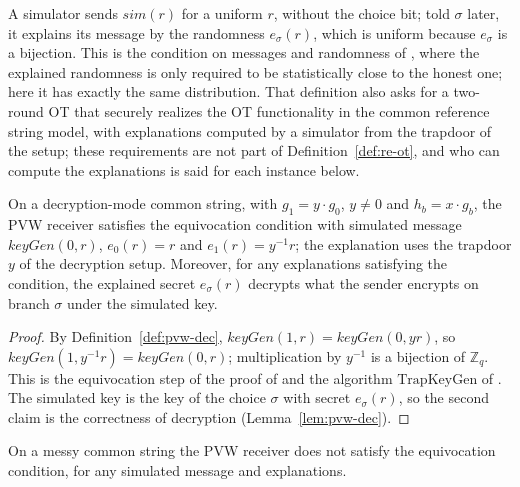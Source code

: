 A simulator sends $\mathit{sim}(r)$ for a uniform $r$, without the choice bit; told $\sigma$ later,
it explains its message by the randomness $e_\sigma(r)$, which is uniform because $e_\sigma$ is a
bijection. This is the condition on messages and randomness of \cite[Sect.~3, Definition~3.1]{GKPS18},
where the explained randomness is only required to be statistically close to the honest one; here
it has exactly the same distribution. That definition also asks for a two-round OT that securely
realizes the OT functionality in the common reference string model, with explanations computed by
a simulator from the trapdoor of the setup; these requirements are not part of
Definition~\ref{def:re-ot}, and who can compute the explanations is said for each instance below.

\begin{theorem}
  \label{thm:pvw-re}
  \leanok
  On a decryption-mode common string, with $g_1 = y \cdot g_0$, $y \neq 0$ and $h_b = x \cdot g_b$,
  the PVW receiver satisfies the equivocation condition with simulated message
  $\mathit{keyGen}(0, r)$, $e_0(r) = r$ and $e_1(r) = y^{-1} r$; the explanation uses the trapdoor
  $y$ of the decryption setup. Moreover, for any explanations satisfying the condition, the
  explained secret $e_\sigma(r)$ decrypts what the sender encrypts on branch $\sigma$ under the
  simulated key.
\end{theorem}

\begin{proof}
  \leanok
  By Definition~\ref{def:pvw-dec}, $\mathit{keyGen}(1, r) = \mathit{keyGen}(0, y r)$, so
  $\mathit{keyGen}(1, y^{-1} r) = \mathit{keyGen}(0, r)$; multiplication by $y^{-1}$ is a bijection
  of $\mathbb{Z}_q$. This is the equivocation step of the proof of \cite[Theorem~3.2]{GKPS18} and
  the algorithm
  $\mathrm{TrapKeyGen}$ of \cite[Sect.~5.3]{PVW08}. The simulated key is the key of the choice
  $\sigma$ with secret $e_\sigma(r)$, so the second claim is the correctness of decryption
  (Lemma~\ref{lem:pvw-dec}).
\end{proof}

\begin{proposition}
  \label{prop:pvw-messy-not-re}
  \leanok
  On a messy common string the PVW receiver does not satisfy the equivocation condition, for any
  simulated message and explanations.
\end{proposition}

